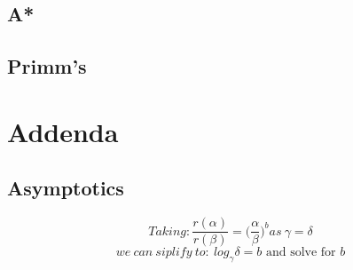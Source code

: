 \documentclass[12pt, letterpaper]{article}
\begin{document}
\subsection{A*}
\subsection{Primm's}
\section{Addenda}
\subsection{Asymptotics}

\begin{equation}
Taking:
\frac{r(\alpha)}{r(\beta)} = \bigg(\frac{\alpha}{\beta}\bigg)^b as\ \gamma = \delta
\end{equation}
\begin{equation}
we\ can\ siplify\ to:\ log_\gamma \delta = b \textrm{ and solve for $b$}
\end{equation}
\end{document}
